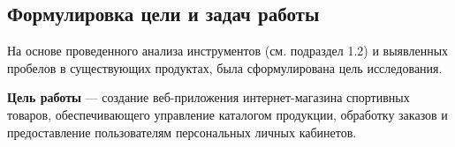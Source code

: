 


\subsection{Формулировка цели и задач работы}

На основе проведенного анализа инструментов (см. подраздел 1.2) и выявленных
пробелов в существующих продуктах, была сформулирована цель исследования.

\textbf{Цель работы} --- создание веб-приложения интернет-магазина спортивных
товаров, обеспечивающего управление каталогом продукции, обработку заказов
и предоставление пользователям персональных личных кабинетов.



